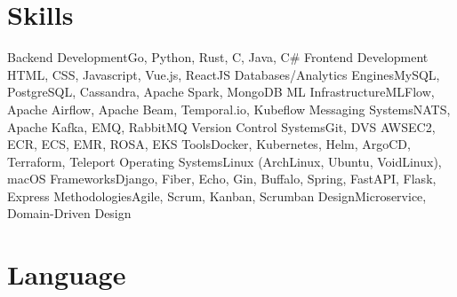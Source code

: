 \section{Skills}

\cvcomputer%
{Backend Development}{Go, Python, Rust, C, Java, C\#}
{Frontend Development}
{HTML, CSS, Javascript, Vue.js, ReactJS}
\vspace{0.5cm}
\cvcomputer%
{Databases/Analytics Engines}{MySQL, PostgreSQL, Cassandra, Apache Spark, MongoDB}
{ML Infrastructure}{MLFlow, Apache Airflow, Apache Beam, Temporal.io, Kubeflow}
\vspace{0.5cm}
\cvcomputer%
{Messaging Systems}{NATS, Apache Kafka, EMQ, RabbitMQ}
{Version Control Systems}{Git, DVS}
\vspace{0.5cm}
\cvcomputer%
{AWS}{EC2, ECR, ECS, EMR, ROSA, EKS}
{Tools}{Docker, Kubernetes, Helm, ArgoCD, Terraform, Teleport}
\cvcomputer%
{Operating Systems}{Linux (ArchLinux, Ubuntu, VoidLinux), macOS}
{Frameworks}{Django, Fiber, Echo, Gin, Buffalo, Spring, FastAPI, Flask, Express}
\cvcomputer%
{Methodologies}{Agile, Scrum, Kanban, Scrumban}
{Design}{Microservice, Domain-Driven Design}

\section{Language}


\emptysection{}\closesection{}
